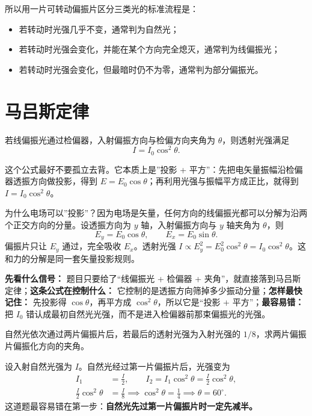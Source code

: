 \documentclass[lang=cn,11pt]{elegantbook}
\begin{document}
\begin{note}
所以用一片可转动偏振片区分三类光的标准流程是：
\begin{itemize}
  \item 若转动时光强几乎不变，通常判为自然光；
  \item 若转动时光强会变化，并能在某个方向完全熄灭，通常判为线偏振光；
  \item 若转动时光强会变化，但最暗时仍不为零，通常判为部分偏振光。
\end{itemize}
\end{note}

\section{马吕斯定律}

若线偏振光通过检偏器，入射偏振方向与检偏方向夹角为 \(\theta\)，则透射光强满足
\[
I=I_0\cos^2\theta.
\]

这个公式最好不要孤立去背。它本质上是”投影 + 平方”：先把电矢量振幅沿检偏器透振方向做投影，得到 \(E=E_0\cos\theta\)；再利用光强与振幅平方成正比，就得到 \(I=I_0\cos^2\theta\)。

\begin{remark}
为什么电场可以”投影”？因为电场是矢量，任何方向的线偏振光都可以分解为沿两个正交方向的分量。设透振方向为 \(y\) 轴，入射偏振方向与 \(y\) 轴夹角为 \(\theta\)，则
\[
E_y=E_0\cos\theta,\qquad E_x=E_0\sin\theta.
\]
偏振片只让 \(E_y\) 通过，完全吸收 \(E_x\)。透射光强 \(I\propto E_y^2=E_0^2\cos^2\theta=I_0\cos^2\theta\)。这和力的分解是同一套矢量投影规则。
\end{remark}

\begin{note}
\textbf{先看什么信号：} 题目只要给了“线偏振光 + 检偏器 + 夹角”，就直接落到马吕斯定律；\textbf{这条公式在控制什么：} 它控制的是透振方向筛掉多少振动分量；\textbf{怎样最快记住：} 先投影得 \(\cos\theta\)，再平方成 \(\cos^2\theta\)，所以它是“投影 + 平方”；\textbf{最容易错：} 把 \(I_0\) 错认成最初自然光光强，而不是进入检偏器前那束偏振光的光强。
\end{note}

\begin{example}[两片偏振片]
自然光依次通过两片偏振片后，若最后的透射光强为入射光强的 \(1/8\)，求两片偏振片偏振化方向的夹角。
\end{example}

\begin{solution}
设入射自然光强为 \(I\)。自然光经过第一片偏振片后，光强变为
\[
\begin{aligned}
I_1&=\frac{I}{2},\qquad
I_2=I_1\cos^2\theta=\frac{I}{2}\cos^2\theta,\\
\frac{I}{2}\cos^2\theta&=\frac{I}{8}
\implies \cos^2\theta=\frac14
\implies \theta=60^\circ.
\end{aligned}
\]
这道题最容易错在第一步：\textbf{自然光先过第一片偏振片时一定先减半。}
\end{solution}
\end{document}
